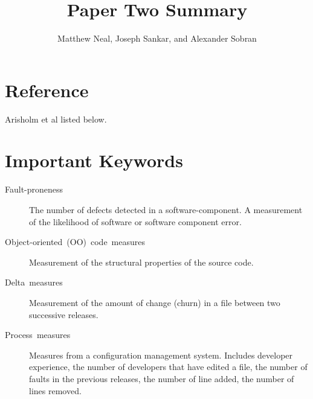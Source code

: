 \documentclass[english]{article}
\begin{document}
\title{Paper Two Summary}


\author{Matthew Neal, Joseph Sankar, and Alexander Sobran}

\maketitle

\section*{Reference}

Arisholm et al \cite{arisholm10} listed below.


\section*{Important Keywords}
\begin{description}
\item [{Fault-proneness}] The number of defects detected in a software-component.
A measurement of the likelihood of software or software component
error. 
\item [{Object-oriented~(OO)~code~measures}] Measurement of the structural
properties of the source code. 
\item [{Delta~measures}] Measurement of the amount of change (churn) in
a file between two successive releases. 
\item [{Process~measures}] Measures from a configuration management system.
Includes developer experience, the number of developers that have
edited a file, the number of faults in the previous releases, the
number of line added, the number of lines removed. 
\end{description}
\end{document}
